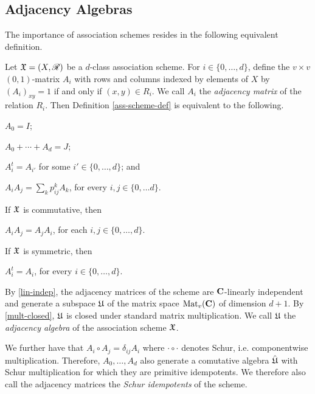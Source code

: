 \documentclass[../../../main]{subfiles}
\begin{document}
\subsection{Adjacency Algebras} 

 The importance of association schemes resides in the following equivalent definition.
 
 \begin{defin}
   Let $\mathfrak{X}=(X,\mathscr{R})$ be a $d$-class association scheme. For $i \in \{0, \dots,
   d\}$, define the $v \times v$ $(0,1)$-matrix $A_i$ with rows and columns
   indexed by elements of $X$ by $(A_i)_{xy} = 1$ if and only if $(x,y) \in
   R_i$. We call $A_i$ the {\it adjacency matrix} of the relation $R_i$. Then
   Definition \ref{ass-scheme-def} is equivalent to the following. 
  \begin{defenum}
   \item\label{id-mat} $A_0=I$;
   \item\label{lin-indep} $A_0 + \cdots + A_d=J$;
   \item\label{trans-closed} $A_i^t=A_{i'}$ for some $i' \in \{0, \dots, d\}$; and
   \item\label{mult-closed} $A_iA_j=\sum_k p_{ij}^kA_k$, for every $i,j \in \{0, \dots d\}$.
  \end{defenum}
  If $\mathfrak{X}$ is commutative, then
  \begin{defenum}[resume]
   \item\label{commutative-scheme} $A_iA_j=A_jA_i$, for each $i,j \in \{0, \dots, d\}$.
  \end{defenum}
  If $\mathfrak{X}$ is symmetric, then
  \begin{defenum}[resume]
   \item\label{symmetric-scheme} $A_i^t=A_i$, for every $i \in \{0, \dots, d\}$.
  \end{defenum}

  By \ref{lin-indep}, the adjacency matrices of the scheme are $\mathbf{C}$-linearly
  independent and generate a subspace $\mathfrak{U}$ of the matrix space $\text{Mat}_v(\mathbf{C})$ of
  dimension $d+1$. 
  By \ref{mult-closed}, $\mathfrak{U}$ is closed under standard matrix multiplication. We
  call $\mathfrak{U}$ the {\it adjacency algebra} of the
  association scheme $\mathfrak{X}$. 
  
  We further have that $A_i \circ A_j = \delta_{ij}A_i$ where $\cdot\circ\cdot$
  denotes Schur, i.e. componentwise multiplication. Therefore, $A_0, \dots, 
  A_d$ also generate a comutative algebra $\hat {\mathfrak{U}}$ with Schur multiplication
  for which they are primitive idempotents. We therefore also
  call the adjacency matrices the {\it Schur idempotents} of the scheme. 
 \end{defin}
 
\end{document}
